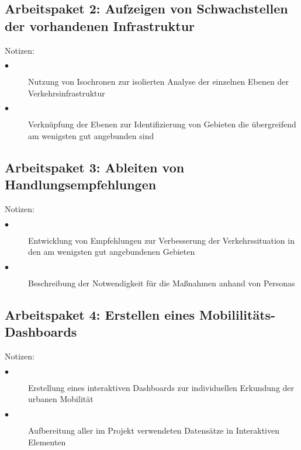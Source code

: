 \subsection{Arbeitspaket 2: Aufzeigen von Schwachstellen der vorhandenen Infrastruktur}
Notizen: 
\begin{description}
    \item[$\bullet$] Nutzung von Isochronen zur isolierten Analyse der einzelnen Ebenen der Verkehrsinfrastruktur
    \item[$\bullet$] Verknüpfung der Ebenen zur Identifizierung von Gebieten die übergreifend am wenigsten gut angebunden sind
  \end{description} 

\subsection{Arbeitspaket 3: Ableiten von Handlungsempfehlungen}
Notizen:
\begin{description}
    \item[$\bullet$] Entwicklung von Empfehlungen zur Verbesserung der Verkehrssituation in den am wenigsten gut angebundenen Gebieten
    \item[$\bullet$] Beschreibung der Notwendigkeit für die Maßnahmen anhand von Personas
  \end{description} 

\subsection{Arbeitspaket 4: Erstellen eines Mobililitäts-Dashboards}
Notizen: 
\begin{description}
    \item[$\bullet$] Erstellung eines interaktiven Dashboards zur individuellen Erkundung der urbanen Mobilität
    \item[$\bullet$] Aufbereitung aller im Projekt verwendeten Datensätze in Interaktiven Elementen
  \end{description} 

